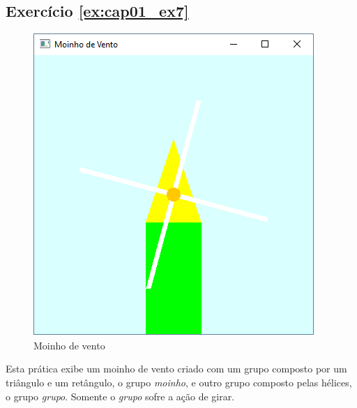 \subsection*{Exercício \ref{ex:cap01_ex7}}
\begin{figure}[ht]
  \centerline{\includegraphics[width=.5\textwidth]{img/cap1_ex7.png}}
  \caption{Moinho de vento}
  \label{fig:cap01_ex7}
\end{figure}
Esta prática exibe um moinho de vento criado com um grupo composto por um triângulo e um retângulo, o grupo \emph{moinho}, e outro grupo composto pelas hélices, o grupo \emph{grupo}. Somente o \emph{grupo} sofre a ação de girar. 

